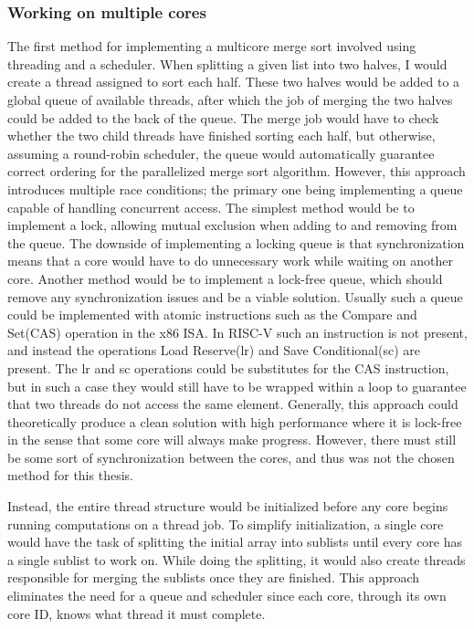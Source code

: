 \subsubsection*{Working on multiple cores}
The first method for implementing a multicore merge sort involved using
threading and a scheduler. When splitting a given list into two halves, I would
create a thread assigned to sort each half. These two halves would be added
to a global queue of available threads, after which the job of merging the two
halves
could be added to the back of the queue. The merge job would have to check
whether the two child threads have finished sorting each half, but otherwise, assuming a
round-robin scheduler, the queue would automatically guarantee correct ordering for
the parallelized merge sort algorithm. However, this approach introduces
multiple race conditions; the primary one being implementing a queue capable of
handling concurrent access. The simplest method would be to implement a lock,
allowing mutual exclusion when adding to and removing from the queue. The
downside of implementing a locking queue is that synchronization means that a
core would have to do unnecessary work while waiting on another core. Another
method would be to implement a lock-free queue, which should remove any
synchronization issues and be a viable solution. Usually such a queue could be
implemented with atomic instructions such as the Compare and Set(CAS) operation
in the x86 ISA. In RISC-V such an instruction is not present, and instead the
operations Load Reserve(lr) and Save Conditional(sc) are present. The lr and sc
operations could be substitutes for the CAS instruction, but in such a case they
would still have to be wrapped within a loop to guarantee that two threads do
not access the same element. Generally, this approach could theoretically
produce a clean solution with high performance where it is lock-free in the
sense that some core will always make progress. However, there must still be
some sort of synchronization between the cores, and thus was not the chosen
method for this thesis.

Instead, the entire thread structure would be initialized before any core begins
running computations on a thread job. To simplify initialization, a single core
would have the task of splitting the initial array into sublists until every
core has a single sublist to work on. While doing the splitting, it would also
create threads responsible for merging the sublists once they are finished. This
approach eliminates the need for a queue and scheduler since each core, through
its own core ID, knows what thread it must complete.


